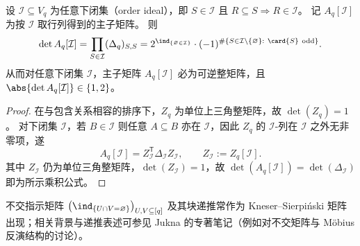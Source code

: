 \begin{corollary}\label{cor:xi-disjointness-boolean-order-ideal-principal-minors}
设 \(\mathcal I\subseteq V_q\) 为任意下闭集（order ideal），即 \(S\in\mathcal I\) 且 \(R\subseteq S\Rightarrow R\in\mathcal I\)。
记 \(A_q[\mathcal I]\) 为按 \(\mathcal I\) 取行列得到的主子矩阵。
则
\[
\det A_q[\mathcal I]
=\prod_{S\in\mathcal I}(\Delta_q)_{S,S}
=2^{\ind_{\{\varnothing\in\mathcal I\}}}\cdot (-1)^{\#\{S\in\mathcal I\setminus\{\varnothing\}:\ \card{S}\ \mathrm{odd}\}}.
\]
从而对任意下闭集 \(\mathcal I\)，主子矩阵 \(A_q[\mathcal I]\) 必为可逆整矩阵，且 \(\abs{\det A_q[\mathcal I]}\in\{1,2\}\)。
\end{corollary}
\begin{proof}
在与包含关系相容的排序下，\(Z_q\) 为单位上三角整矩阵，故 \(\det(Z_q)=1\)。
对下闭集 \(\mathcal I\)，若 \(B\in\mathcal I\) 则任意 \(A\subseteq B\) 亦在 \(\mathcal I\)，因此 \(Z_q\) 的 \(\mathcal I\)-列在 \(\mathcal I\) 之外无非零项，遂
\[
A_q[\mathcal I]=Z_{\mathcal I}^{\mathsf T}\Delta_{\mathcal I}Z_{\mathcal I},
\qquad
Z_{\mathcal I}:=Z_q[\mathcal I].
\]
其中 \(Z_{\mathcal I}\) 仍为单位三角整矩阵，\(\det(Z_{\mathcal I})=1\)，故
\(\det(A_q[\mathcal I])=\det(\Delta_{\mathcal I})\)
即为所示乘积公式。
\end{proof}

\begin{remark}\label{rem:xi-disjointness-kneser-sierpinski}
不交指示矩阵 \(\bigl(\ind_{\{U\cap V=\varnothing\}}\bigr)_{U,V\subseteq[q]}\) 及其块递推常作为 Kneser--Sierpiński 矩阵出现；相关背景与递推表述可参见 Jukna 的专著笔记（例如对不交矩阵与 Möbius 反演结构的讨论）\cite{Jukna2011ExtremalCombinatorics}。
\end{remark}

